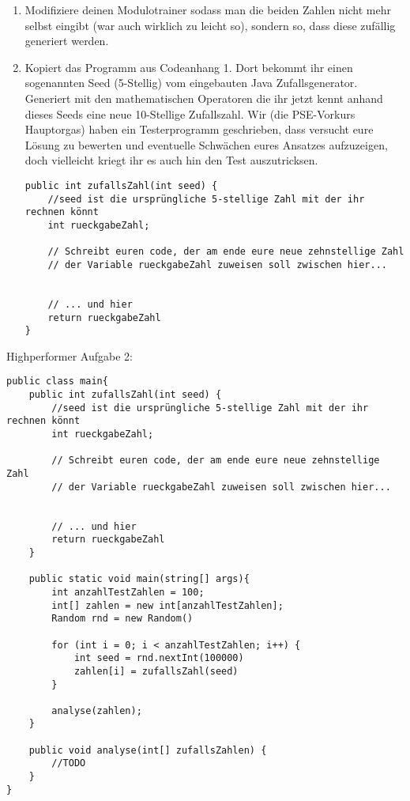 \documentclass{../../sheet}
\begin{document}
\begin{enumerate}
    \item Modifiziere deinen Modulotrainer sodass man die beiden Zahlen nicht mehr selbst eingibt (war auch wirklich zu leicht so), sondern so, dass diese zufällig generiert werden.
    \item Kopiert das Programm aus Codeanhang 1. Dort bekommt ihr einen sogenannten Seed (5-Stellig) vom eingebauten Java Zufallsgenerator. Generiert mit den mathematischen Operatoren die ihr jetzt kennt anhand dieses Seeds eine neue 10-Stellige Zufallszahl. Wir (die PSE-Vorkurs Hauptorgas) haben ein Testerprogramm geschrieben, dass versucht eure Lösung zu bewerten und eventuelle Schwächen eures Ansatzes aufzuzeigen, doch vielleicht kriegt ihr es auch hin den Test auszutricksen.

          \begin{verbatim}
public int zufallsZahl(int seed) {
    //seed ist die ursprüngliche 5-stellige Zahl mit der ihr rechnen könnt
    int rueckgabeZahl;

    // Schreibt euren code, der am ende eure neue zehnstellige Zahl
    // der Variable rueckgabeZahl zuweisen soll zwischen hier...


    // ... und hier
    return rueckgabeZahl
}
    \end{verbatim}
\end{enumerate}

\newpage
{}
Highperformer Aufgabe 2:
\begin{verbatim}
public class main{
    public int zufallsZahl(int seed) {
        //seed ist die ursprüngliche 5-stellige Zahl mit der ihr rechnen könnt
        int rueckgabeZahl;

        // Schreibt euren code, der am ende eure neue zehnstellige Zahl
        // der Variable rueckgabeZahl zuweisen soll zwischen hier...


        // ... und hier
        return rueckgabeZahl
    }

    public static void main(string[] args){
        int anzahlTestZahlen = 100;
        int[] zahlen = new int[anzahlTestZahlen];
        Random rnd = new Random()

        for (int i = 0; i < anzahlTestZahlen; i++) {
            int seed = rnd.nextInt(100000)
            zahlen[i] = zufallsZahl(seed)
        }

        analyse(zahlen);
    }

    public void analyse(int[] zufallsZahlen) {
        //TODO
    }
}
\end{verbatim}
\end{document}
